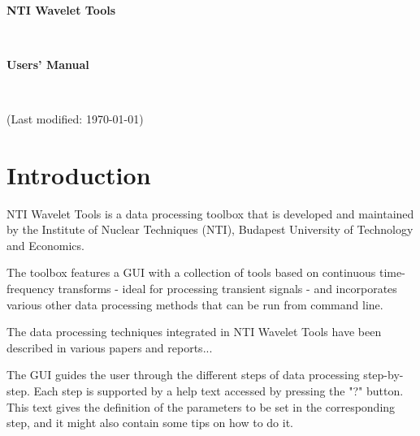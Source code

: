 \documentclass[12pt]{article}
\begin{document}
\begin{titlepage}
\begin{center}
\ \\
\vspace{2.5 in}
\begin{Huge}\textbf{NTI Wavelet Tools}\end{Huge}\\
\vspace{0.1 in}

\vspace{0.1 in}

\vspace{1.5 in}
\begin{Huge}\textbf{Users' Manual}\end{Huge}\\


\vspace{2.3 in}

(Last modified: \today)
\end{center}
\end{titlepage}


\newpage

\tableofcontents
\pagebreak

\section{Introduction}

NTI Wavelet Tools is a data processing toolbox that is developed and maintained by the Institute of Nuclear Techniques (NTI), Budapest University of Technology and Economics.

The toolbox features a GUI with a collection of tools based on continuous time-frequency transforms - ideal for processing transient signals - and incorporates various other data processing methods that can be run from command line.

The data processing techniques integrated in NTI Wavelet Tools have been described in various papers and reports...

The GUI guides the user through the different steps of data processing step-by-step. Each step is supported by a help text accessed by pressing the "?" button. This text gives the definition of the parameters to be set in the corresponding step, and it might also contain some tips on how to do it.
\end{document}
